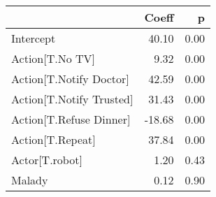\begin{tabular}{lrr}
\toprule
{} &  Coeff &    p \\
\midrule
Intercept                &  40.10 & 0.00 \\
Action[T.No TV]          &   9.32 & 0.00 \\
Action[T.Notify Doctor]  &  42.59 & 0.00 \\
Action[T.Notify Trusted] &  31.43 & 0.00 \\
Action[T.Refuse Dinner]  & -18.68 & 0.00 \\
Action[T.Repeat]         &  37.84 & 0.00 \\
Actor[T.robot]           &   1.20 & 0.43 \\
Malady                   &   0.12 & 0.90 \\
\bottomrule
\end{tabular}

